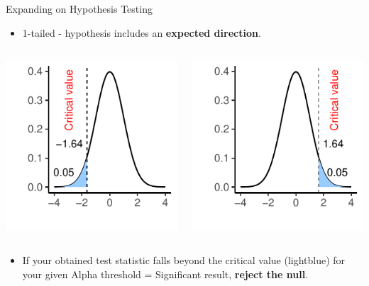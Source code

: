 \documentclass[
  ignorenonframetext,
]{beamer}
\providecommand{\tightlist}{%
  \setlength{\itemsep}{0pt}\setlength{\parskip}{0pt}}
\begin{document}
\begin{frame}{Expanding on Hypothesis Testing}
\label{expanding-on-hypothesis-testing-1}
\begin{itemize}
\tightlist
\item
  1-tailed - hypothesis includes an \textbf{expected direction}.
\end{itemize}

\begin{columns}[T]
\begin{column}{0.5\textwidth}
\vspace{1cm}

\includegraphics{Inferential-Stat-and-Z-test_files/figure-beamer/unnamed-chunk-3-1.pdf}
\end{column}

\begin{column}{0.5\textwidth}
\vspace{1cm}

\includegraphics{Inferential-Stat-and-Z-test_files/figure-beamer/unnamed-chunk-4-1.pdf}
\end{column}
\end{columns}

\begin{itemize}
\tightlist
\item
  If your obtained test statistic falls beyond the critical value
  (lightblue) for your given Alpha threshold = Significant result,
  \textbf{reject the null}.
\end{itemize}
\end{frame}
\end{document}
